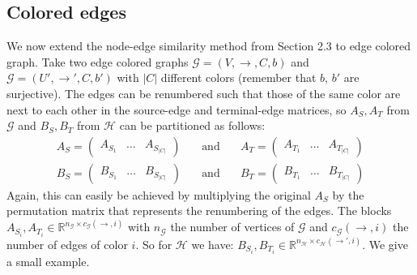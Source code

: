\documentclass[a4paper,11pt]{report}
\newcommand{\R}{{\mathbb R}}
\newcommand{\graf}{\mathscr{G}}
\newcommand{\grafeen}{\mathscr{H}}
\newcommand{\hgraf}{\mathcal{G}}
\begin{document}
\subsection{Colored edges}
We now extend the node-edge similarity method from Section 2.3 to edge colored 
graph. Take two edge colored graphs $\graf = (V, \to, C, b)$ and $\hgraf = (U', \to', C, b')$ 
with $|C|$ different colors (remember that $b$, $b'$ are surjective). The edges 
can be renumbered such that those of the same color are next to each other in the 
source-edge and terminal-edge matrices, so $A_S, A_T$ from 
$\graf$ and $B_S, B_T$ from $\grafeen$ can be partitioned as follows:
\begin{eqnarray*}
  A_S = \begin{pmatrix}
  A_{S_1} & \ldots & A_{S_{|C|}}
  \end{pmatrix} \quad &\text{and}& \quad A_T = \begin{pmatrix}
  A_{T_1} & \ldots & A_{T_{|C|}}
  \end{pmatrix}\\
   B_S = \begin{pmatrix}
  B_{S_1} & \ldots & B_{S_{|C|}}
  \end{pmatrix} \quad &\text{and}& \quad B_T = \begin{pmatrix}
  B_{T_1} & \ldots & B_{T_{|C|}}
  \end{pmatrix}
\end{eqnarray*}
Again, this can easily be achieved by multiplying the original $A_S$ by the permutation matrix
that represents the renumbering of the edges. The blocks $A_{S_i}, A_{T_i} \in \R^{n_\graf \times c_\graf(\to, i)}$ with $n_\graf$ 
the number of vertices of $\graf$ and $c_\graf(\to,i)$ the number of edges of 
color $i$. So for $\grafeen$ we have: $B_{S_i}, B_{T_i} \in \R^{n_\grafeen \times c_\grafeen(\to', 
i)}$. We give a small example.
\end{document}

